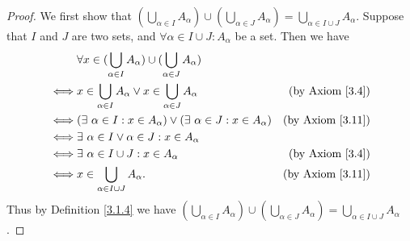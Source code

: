 \begin{proof}
    We first show that \((\bigcup_{\alpha \in I} A_{\alpha}) \cup (\bigcup_{\alpha \in J} A_{\alpha}) = \bigcup_{\alpha \in I \cup J} A_{\alpha}\).
    Suppose that \(I\) and \(J\) are two sets, and \(\forall \alpha \in I \cup J : A_{\alpha}\) be a set.
    Then we have
    \begin{align*}
             & \forall x \in (\bigcup_{\alpha \in I} A_{\alpha}) \cup (\bigcup_{\alpha \in J} A_{\alpha})                                \\
        \iff & x \in \bigcup_{\alpha \in I} A_{\alpha} \lor x \in \bigcup_{\alpha \in J} A_{\alpha}       & \text{(by Axiom \ref{3.4})}  \\
        \iff & (\exists\ \alpha \in I : x \in A_{\alpha}) \lor (\exists\ \alpha \in J : x \in A_{\alpha}) & \text{(by Axiom \ref{3.11})} \\
        \iff & \exists\ \alpha \in I \lor \alpha \in J : x \in A_{\alpha}                                                                \\
        \iff & \exists\ \alpha \in I \cup J : x \in A_{\alpha}                                            & \text{(by Axiom \ref{3.4})}  \\
        \iff & x \in \bigcup_{\alpha \in I \cup J} A_{\alpha}.                                            & \text{(by Axiom \ref{3.11})}
    \end{align*}
    Thus by Definition \ref{3.1.4} we have \((\bigcup_{\alpha \in I} A_{\alpha}) \cup (\bigcup_{\alpha \in J} A_{\alpha}) = \bigcup_{\alpha \in I \cup J} A_{\alpha}\).


\end{proof}
